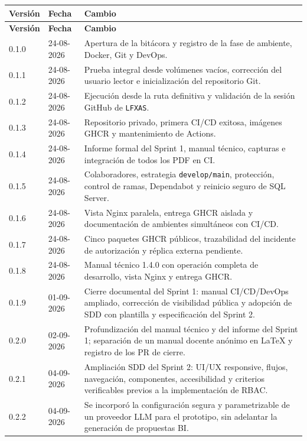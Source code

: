 \documentclass[11pt,letterpaper]{article}
\newcommand{\file}[1]{\texttt{#1}}
\begin{document}
\begin{longtable}{@{}p{0.82in}@{\hspace{0.16in}}p{0.98in}@{\hspace{0.16in}}p{4.36in}@{}}
  \toprule
  \textbf{Versión} & \textbf{Fecha} & \textbf{Cambio} \\
  \midrule
  \endfirsthead
  \toprule
  \textbf{Versión} & \textbf{Fecha} & \textbf{Cambio} \\
  \midrule
  \endhead
  0.1.0 & 24-08-2026 & Apertura de la bitácora y registro de la fase de ambiente, Docker, Git y DevOps. \\
  0.1.1 & 24-08-2026 & Prueba integral desde volúmenes vacíos, corrección del usuario lector e inicialización del repositorio Git. \\
  0.1.2 & 24-08-2026 & Ejecución desde la ruta definitiva y validación de la sesión GitHub de \file{LFXAS}. \\
  0.1.3 & 24-08-2026 & Repositorio privado, primera CI/CD exitosa, imágenes GHCR y mantenimiento de Actions. \\
  0.1.4 & 24-08-2026 & Informe formal del Sprint 1, manual técnico, capturas e integración de todos los PDF en CI. \\
  0.1.5 & 24-08-2026 & Colaboradores, estrategia \file{develop/main}, protección, control de ramas, Dependabot y reinicio seguro de SQL Server. \\
  0.1.6 & 24-08-2026 & Vista Nginx paralela, entrega GHCR aislada y documentación de ambientes simultáneos con CI/CD. \\
  0.1.7 & 24-08-2026 & Cinco paquetes GHCR públicos, trazabilidad del incidente de autorización y réplica externa pendiente. \\
  0.1.8 & 24-08-2026 & Manual técnico 1.4.0 con operación completa de desarrollo, vista Nginx y entrega GHCR. \\
  0.1.9 & 01-09-2026 & Cierre documental del Sprint 1: manual CI/CD/DevOps ampliado, corrección de visibilidad pública y adopción de SDD con plantilla y especificación del Sprint 2. \\
  0.2.0 & 02-09-2026 & Profundización del manual técnico y del informe del Sprint 1; separación de un manual docente anónimo en LaTeX y registro de los PR de cierre. \\
  0.2.1 & 04-09-2026 & Ampliación SDD del Sprint 2: UI/UX responsive, flujos, navegación, componentes, accesibilidad y criterios verificables previos a la implementación de RBAC. \\
  0.2.2 & 04-09-2026 & Se incorporó la configuración segura y parametrizable de un proveedor LLM para el prototipo, sin adelantar la generación de propuestas BI. \\

\end{longtable}
\end{document}
